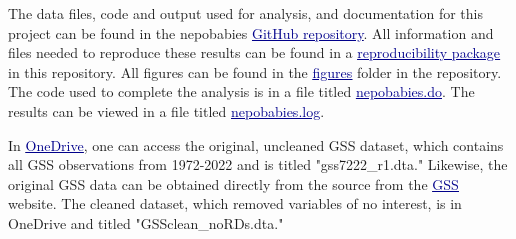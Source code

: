 \documentclass[12pt]{article}
\begin{document}
\newcommand{\hrefunderline}[2]{\href{#1}{\textcolor{darkblue}{\uline{#2}}}}


\hypersetup{
    linkcolor=darkblue,    %
    citecolor=darkblue,    %
    filecolor=darkblue,    %
    urlcolor=darkblue      %
}

The data files, code and output used for analysis, and documentation for this project can be found in the nepobabies \hrefunderline{https://github.com/ecn310/course-project-nepobabies}{GitHub repository}. All information and files needed to reproduce these results can be found in a 
\hrefunderline{https://github.com/ecn310/course-project-nepobabies/blob/main/Final\%20Report/ReproducibilityPackage.md}{reproducibility package}
in this repository. All figures can be found in the 
\hrefunderline{https://github.com/ecn310/course-project-nepobabies/tree/main/Final\%20Report/figures}{figures} 
folder in the repository. The code used to complete the analysis is in a file titled \hrefunderline{https://github.com/ecn310/course-project-nepobabies/blob/main/DoFiles/nepobabies.do}{nepobabies.do}. The results can be viewed in a file titled \hrefunderline{https://github.com/ecn310/course-project-nepobabies/blob/main/DoFiles/nepobabies.log}{nepobabies.log}.

In \hrefunderline{https://sumailsyr-my.sharepoint.com/personal/rhrabino_syr_edu/_layouts/15/onedrive.aspx?id=\%2Fpersonal\%2Frhrabino\%5Fsyr\%5Fedu\%2FDocuments\%2FECN\%20310\%20Project&FolderCTID=0x012000B87F490D5FFF3342AC97956897C98D3E&view=0}{OneDrive}, one can access the original, uncleaned GSS dataset, which contains all GSS observations from 1972-2022 and is titled "gss7222\_r1.dta." Likewise, the original GSS data can be obtained directly from the source from the \hrefunderline{https://gss.norc.org/get-the-data/stata}{GSS} website. The cleaned dataset, which removed variables of no interest, is in OneDrive and titled "GSSclean\_noRDs.dta."
\end{document}
